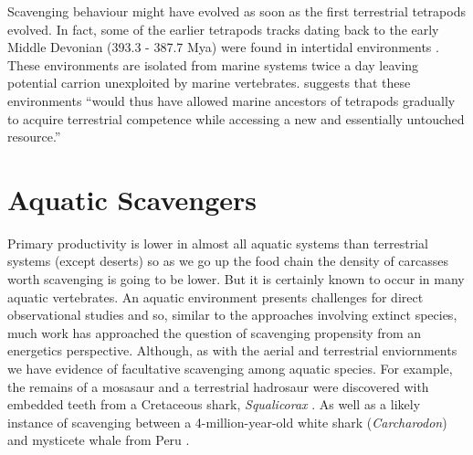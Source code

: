 \documentclass[a4paper,12pt]{article}
\begin{document}
Scavenging behaviour might have evolved as soon as the first terrestrial tetrapods evolved.
In fact, some of the earlier tetrapods tracks dating back to the early Middle Devonian (393.3 - 387.7 Mya) were found in intertidal environments \citep{Niedzwiedzki2009}.
These environments are isolated from marine systems twice a day leaving potential carrion unexploited by marine vertebrates.
\cite{Niedzwiedzki2009} suggests that these environments ``would thus have allowed marine ancestors of tetrapods gradually to acquire terrestrial competence while accessing a new and essentially untouched resource.''









 

















 




\section*{Aquatic Scavengers} 
Primary productivity is lower in almost all aquatic systems than terrestrial systems (except deserts) so as we go up the food chain the density of carcasses worth scavenging is going to be lower.
But it is certainly known to occur in many aquatic vertebrates.
An aquatic environment presents challenges for direct observational studies and so, similar to the approaches involving extinct species, much work has approached the question of scavenging propensity from an energetics perspective.
Although, as with the aerial and terrestrial enviornments we have evidence of facultative scavenging among aquatic species.
For example, the remains of a mosasaur and a terrestrial hadrosaur were discovered with embedded teeth from a Cretaceous shark, \textit{Squalicorax} \citep{schwimmer1997scavenging}.
As well as a likely instance of scavenging between a 4-million-year-old white shark (\textit{Carcharodon}) and mysticete whale from Peru \citep{ehret2009caught}.
 
\end{document}
